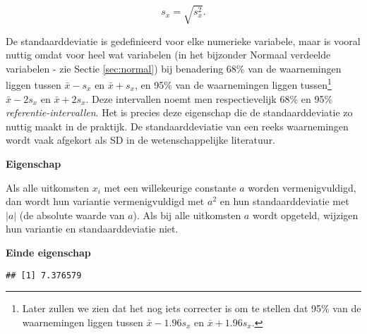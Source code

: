 \documentclass[
  12pt,dutch,coursenotes]{book}
\newenvironment{Shaded}{\begin{snugshade}}{\end{snugshade}}
\newcommand{\CommentTok}[1]{\textcolor[rgb]{0.56,0.35,0.01}{\textit{#1}}}
\newcommand{\DataTypeTok}[1]{\textcolor[rgb]{0.13,0.29,0.53}{#1}}
\newcommand{\KeywordTok}[1]{\textcolor[rgb]{0.13,0.29,0.53}{\textbf{#1}}}
\newcommand{\NormalTok}[1]{#1}
\newcommand{\OperatorTok}[1]{\textcolor[rgb]{0.81,0.36,0.00}{\textbf{#1}}}
\newcommand{\OtherTok}[1]{\textcolor[rgb]{0.56,0.35,0.01}{#1}}
\theoremstyle{definition}
\theoremstyle{definition}
\theoremstyle{definition}
\theoremstyle{remark}
\begin{document}
\begin{equation*}
s_x= \sqrt{s_x^2} .
\end{equation*}

De standaarddeviatie is gedefinieerd voor elke numerieke variabele, maar is
vooral nuttig omdat voor heel wat variabelen (in het bijzonder Normaal
verdeelde variabelen - zie Sectie \ref{sec:normal}) bij benadering 68\% van
de waarnemingen liggen tussen \(\bar{x} - s_x\) en \(\bar{x} + s_x\), en 95\%
van de waarnemingen liggen tussen\footnote{Later zullen we zien dat het nog iets correcter is om te stellen dat 95\% van de waarnemingen liggen tussen \(\bar{x} - 1.96 s_x\) en \(\bar{x} + 1.96 s_x\).}
\(\bar{x} - 2 s_x\) en \(\bar{x} + 2 s_x\). Deze intervallen noemt men respectievelijk 68\% en 95\% \emph{referentie-intervallen}. Het is precies deze eigenschap die de
standaarddeviatie zo nuttig maakt in de praktijk. De standaarddeviatie van
een reeks waarnemingen wordt vaak afgekort als SD in de wetenschappelijke literatuur.

\textbf{Eigenschap}

Als alle uitkomsten \(x_i\) met een willekeurige constante \(a\)
worden vermenigvuldigd, dan wordt hun variantie vermenigvuldigd met \(a^2\) en
hun standaarddeviatie met \(|a|\) (de absolute waarde van \(a\)). Als bij alle
uitkomsten \(a\) wordt opgeteld, wijzigen hun variantie en standaarddeviatie
niet.

\textbf{Einde eigenschap}

\begin{Shaded}
\end{Shaded}

\begin{verbatim}
## [1] 7.376579
\end{verbatim}

\begin{Shaded}
\end{Shaded}
\end{document}
